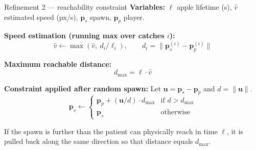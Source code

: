 \documentclass[10pt,aspectratio=169]{beamer}
\begin{document}

\begin{frame}{Refinement 2 --- reachability constraint}
\textbf{Variables:} $\ell$ apple lifetime (s), $\hat{v}$ estimated speed (px/s), $\mathbf{p}_s$ spawn, $\mathbf{p}_p$ player.

\vspace{0.4em}
\textbf{Speed estimation (running max over catches $i$):}
\[
\hat{v} \leftarrow \max\!\left( \hat{v},\ d_i / \ell_i \right), \qquad d_i = \|\mathbf{p}_s^{(i)} - \mathbf{p}_p^{(i)}\|
\]

\textbf{Maximum reachable distance:}
\[
d_{\max} = \ell \cdot \hat{v}
\]

\textbf{Constraint applied after random spawn:}
Let $\mathbf{u} = \mathbf{p}_s - \mathbf{p}_p$ and $d = \|\mathbf{u}\|$.
\[
\mathbf{p}_s \leftarrow
\begin{cases}
\mathbf{p}_p + (\mathbf{u} / d) \cdot d_{\max} & \text{if } d > d_{\max} \\[4pt]
\mathbf{p}_s & \text{otherwise}
\end{cases}
\]

If the spawn is further than the patient can physically reach in time $\ell$, it is pulled back along the same direction so that distance equals $d_{\max}$.
\end{frame}


\end{document}
